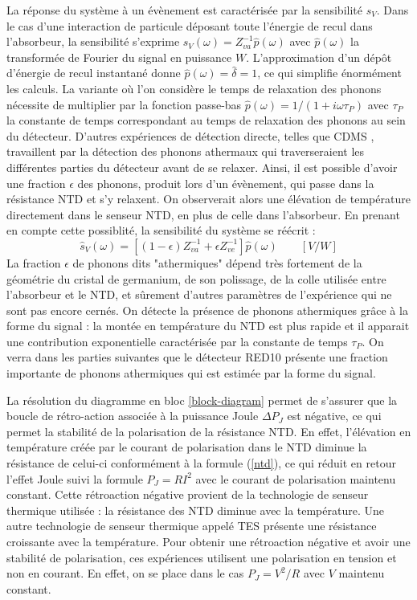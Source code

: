 La réponse du système à un évènement est caractérisée par la sensibilité $s_V$. Dans le cas d'une interaction de particule déposant toute l'énergie de recul dans l'absorbeur, la sensibilité s'exprime ${s}_V(\omega) = Z_{va}^{-1}\hat{p}(\omega)$ avec $\hat{p}(\omega)$ la transformée de Fourier du signal en puissance $W$. L'approximation d'un dépôt d'énergie de recul instantané donne $\hat{p}(\omega) = \hat{\delta} = 1$, ce qui simplifie énormément les calculs. La variante où l'on considère le temps de relaxation des phonons nécessite de multiplier par la fonction passe-bas $\hat{p}(\omega) = 1/(1+i\omega \tau_P)$ avec $\tau_P$ la constante de temps correspondant au temps de relaxation des phonons au sein du détecteur. D'autres expériences de détection directe, telles que CDMS \cite{julien}, travaillent par la détection des phonons athermaux qui traverseraient les différentes parties du détecteur avant de se relaxer. Ainsi, il est possible d'avoir une fraction $\epsilon$ des phonons, produit lors d'un évènement, qui passe dans la résistance NTD et s'y relaxent. On observerait alors une élévation de température directement dans le senseur NTD, en plus de celle dans l'absorbeur. En prenant en compte cette possiblité, la sensibilité du système se réécrit :
\begin{equation}
\label{sv}
\hat{s}_V(\omega) = \left[(1-\epsilon) Z_{va}^{-1} + \epsilon Z_{ve}^{-1}\right]\hat{p}(\omega) \qquad [V/W]
\end{equation}
La fraction $\epsilon$ de phonons dits "athermiques" dépend très fortement de la géométrie du cristal de germanium, de son polissage, de la colle utilisée entre l'absorbeur et le NTD, et sûrement d'autres paramètres de l'expérience qui ne sont pas encore cernés. On détecte la présence de phonons athermiques grâce à la forme du signal : la montée en température du NTD est plus rapide et il apparait une contribution exponentielle caractérisée par la constante de temps $\tau_P$. On verra dans les parties suivantes que le détecteur RED10 présente une fraction importante de phonons athermiques qui est estimée par la forme du signal.

La résolution du diagramme en bloc \ref{block-diagram} permet de s'assurer que la boucle de rétro-action associée à la puissance Joule $\Delta P_J$ est négative, ce qui permet la stabilité de la polarisation de la résistance NTD. En effet, l'élévation en température créée par le courant de polarisation dans le NTD diminue la résistance de celui-ci conformément à la formule (\ref{ntd}), ce qui réduit en retour l'effet Joule suivi la formule $P_J=RI^2$ avec le courant de polarisation maintenu constant. Cette rétroaction négative provient de la technologie de senseur thermique utilisée : la résistance des NTD diminue avec la température. Une autre technologie de senseur thermique appelé TES \cite{julien} \cite{matrix} présente une résistance croissante avec la température. Pour obtenir une rétroaction négative et avoir une stabilité de polarisation, ces expériences utilisent une polarisation en tension et non en courant. En effet, on se place dans le cas $P_J=V^2/R$ avec $V$ maintenu constant.


